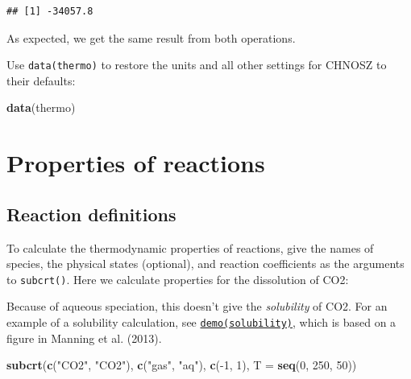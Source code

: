 \documentclass[]{tufte-book}
\newenvironment{Shaded}{}{}
\newcommand{\KeywordTok}[1]{\textcolor[rgb]{0.00,0.44,0.13}{\textbf{#1}}}
\newcommand{\DataTypeTok}[1]{\textcolor[rgb]{0.56,0.13,0.00}{#1}}
\newcommand{\DecValTok}[1]{\textcolor[rgb]{0.25,0.63,0.44}{#1}}
\newcommand{\StringTok}[1]{\textcolor[rgb]{0.25,0.44,0.63}{#1}}
\newcommand{\OperatorTok}[1]{\textcolor[rgb]{0.40,0.40,0.40}{#1}}
\newcommand{\NormalTok}[1]{#1}
\begin{document}
\begin{Shaded}
\end{Shaded}

\begin{verbatim}
## [1] -34057.8
\end{verbatim}

As expected, we get the same result from both operations.

Use {\texttt{data(thermo)}} to restore the units and all other settings
for CHNOSZ to their defaults:

\begin{Shaded}
\begin{Highlighting}[]
\KeywordTok{data}\NormalTok{(thermo)}
\end{Highlighting}
\end{Shaded}

\hypertarget{properties-of-reactions}{\chapter{Properties of
reactions}\label{properties-of-reactions}}

\section{Reaction definitions}\label{reaction-definitions}

To calculate the thermodynamic properties of reactions, give the names
of species, the physical states (optional), and reaction coefficients as
the arguments to {\texttt{subcrt()}}. Here we calculate properties for
the dissolution of CO2:

\begin{marginfigure}
Because of aqueous speciation, this doesn't give the \emph{solubility}
of CO2. For an example of a solubility calculation, see
\href{../demo}{{\texttt{demo(solubility)}}}, which is based on a figure
in Manning et al. (2013).
\end{marginfigure}

\begin{Shaded}
\begin{Highlighting}[]
\KeywordTok{subcrt}\NormalTok{(}\KeywordTok{c}\NormalTok{(}\StringTok{"CO2"}\NormalTok{, }\StringTok{"CO2"}\NormalTok{), }\KeywordTok{c}\NormalTok{(}\StringTok{"gas"}\NormalTok{, }\StringTok{"aq"}\NormalTok{), }\KeywordTok{c}\NormalTok{(}\OperatorTok{-}\DecValTok{1}\NormalTok{, }\DecValTok{1}\NormalTok{), }\DataTypeTok{T =} \KeywordTok{seq}\NormalTok{(}\DecValTok{0}\NormalTok{, }\DecValTok{250}\NormalTok{, }\DecValTok{50}\NormalTok{))}
\end{Highlighting}
\end{Shaded}
\end{document}

